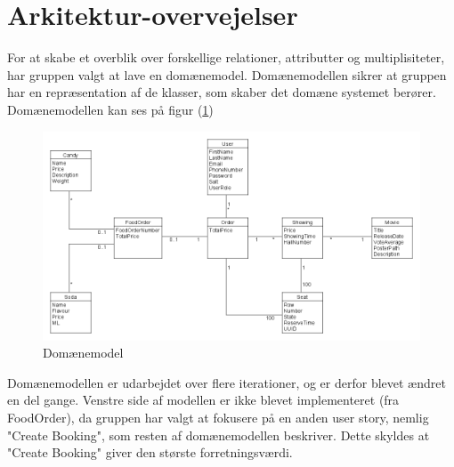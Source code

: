 \section{Arkitektur-overvejelser}\label{sec:arkitektur}
For at skabe et overblik over forskellige relationer, attributter og multiplisiteter, 
har gruppen valgt at lave en domænemodel.
Domænemodellen sikrer at gruppen har en repræsentation af de klasser, som skaber det domæne systemet berører.\\

Domænemodellen kan ses på figur (\ref{fig:domain})

\begin{figure}[H]
    \centering
    \includegraphics[width=1\textwidth]{figures/Domainmodel.png}
    \caption{Domænemodel}
    \label{fig:domain}
\end{figure}

Domænemodellen er udarbejdet over flere iterationer, og er derfor blevet ændret en del gange.
Venstre side af modellen er ikke blevet implementeret (fra FoodOrder), da gruppen har valgt at fokusere på
en anden user story, nemlig "Create Booking", som resten af domænemodellen beskriver. Dette skyldes at "Create Booking"
giver den største forretningsværdi.

